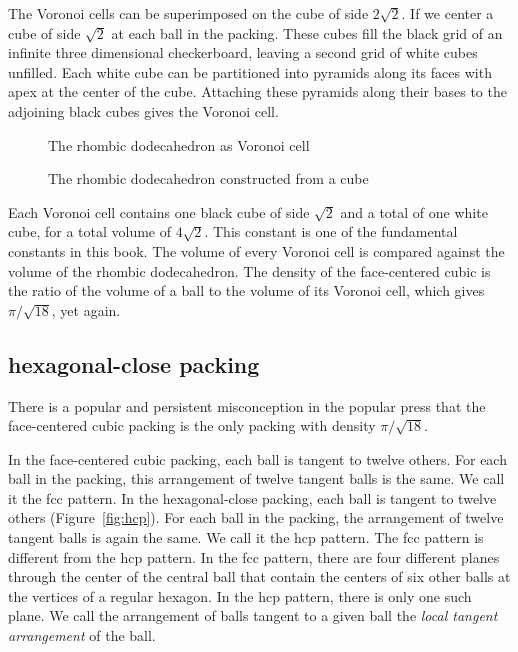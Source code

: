 The Voronoi cells can be superimposed on the cube of side $2\sqrt2$.  If we center
a cube of side $\sqrt2$ at each ball in the packing. These cubes fill
the black grid of an infinite three dimensional checkerboard,
leaving a second grid of white cubes unfilled.  Each
white cube can be partitioned into  pyramids along
its faces with apex at the center of the cube.  Attaching these pyramids
along their bases to the adjoining black cubes gives the Voronoi cell.

\begin{figure}[htb]
  \centering
  \caption{The rhombic dodecahedron as Voronoi cell}
  \label{fig:rhombic}
\end{figure}

\begin{figure}[htb]
  \centering
  \caption{The rhombic dodecahedron constructed from a cube}
  \label{fig:rhombic-cube}
\end{figure}

Each Voronoi cell contains one black cube of side $\sqrt2$ and a total
of one white cube, for a total volume of $4\sqrt2$.  This constant is one of the
fundamental constants in this book.  The volume of every Voronoi cell
is compared against the volume of the rhombic dodecahedron.
The density of the face-centered
cubic is the ratio of the volume of a ball to the volume of its Voronoi
cell, which gives $\pi/\sqrt{18}$, yet again.





\subsection{hexagonal-close packing}

There
is a popular and persistent misconception in the popular press
that the face-centered cubic packing is the only packing with
density $\pi/\sqrt{18}$. 

In the face-centered cubic packing, each ball is tangent to twelve
others.  For each ball in the packing, this arrangement of twelve
tangent balls is the same.  We call it the fcc pattern. 
In the
hexagonal-close packing, each ball is tangent to twelve others
(Figure~\ref{fig:hcp}).
For each ball in the packing, the arrangement of twelve tangent
balls is again the same.  We call it the hcp pattern.  The fcc
pattern is different from the hcp pattern.  In the fcc pattern,
there are four different planes through the center of the central
ball that contain the centers of six other balls at the vertices
of a regular hexagon.  In the hcp pattern, there is only one such
plane.  We call the arrangement of balls tangent to a given ball
the {\it local tangent arrangement} of the ball.

